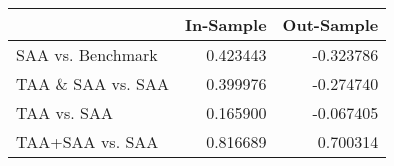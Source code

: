 \begin{tabular}{lrr}
\toprule
{} &  In-Sample &  Out-Sample \\
\midrule
SAA vs. Benchmark &   0.423443 &   -0.323786 \\
TAA \& SAA vs. SAA &   0.399976 &   -0.274740 \\
TAA vs. SAA       &   0.165900 &   -0.067405 \\
TAA+SAA vs. SAA   &   0.816689 &    0.700314 \\
\bottomrule
\end{tabular}
